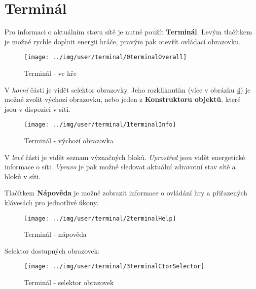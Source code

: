 
\section{Terminál}

Pro informaci o aktuálním stavu sítě je nutné použít \textbf{Terminál}. Levým tlačítkem je možné rychle doplnit energii hráče, pravým pak otevřít ovládací obrazovku.

\begin{figure}[!ht]\centering
\texttt{[image: ../img/user/terminal/0terminalOverall]}

\caption{Terminál - ve hře}
\label{fig:user_terminal_0terminalOverall}

\end{figure}

\FloatBarrier

V \textit{horní} části je vidět selektor obrazovky. Jeho rozkliknutím (více v obrázku \ref{fig:user_terminal_3terminalCtorSelector}) je možné zvolit výchozí obrazovku, nebo jeden z \textbf{Konstruktoru objektů}, které jsou v dispozici v síti.




\begin{figure}[!ht]\centering
\texttt{[image: ../img/user/terminal/1terminalInfo]}

\caption{Terminál - výchozí obrazovka}
\label{fig:user_terminal_1terminalInfo}

\end{figure}

\FloatBarrier
V \textit{levé} části je vidět seznam význačných bloků. \textit{Uprostřed} jsou vidět energetické informace o síti. \textit{Vpravo} je pak možné sledovat aktuální zdravotní stav sítě a bloků v síti.

Tlačítkem \textbf{Nápověda} je možné zobrazit informace o ovládání hry a přiřazených klávesách pro jednotlivé úkony.

\begin{figure}[!ht]\centering
\texttt{[image: ../img/user/terminal/2terminalHelp]}

\caption{Terminál - nápověda}
\label{fig:user_terminal_2terminalHelp}

\end{figure}

\FloatBarrier

Selektor dostupných obrazovek:

\begin{figure}[!ht]\centering
\texttt{[image: ../img/user/terminal/3terminalCtorSelector]}

\caption{Terminál - selektor obrazovek}
\label{fig:user_terminal_3terminalCtorSelector}

\end{figure}


